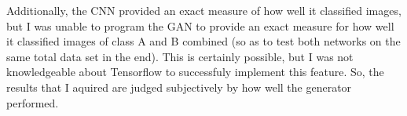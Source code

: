 \documentclass{article}
\begin{document}
Additionally, the CNN provided an exact measure of how well it classified images, but I was unable to program the GAN to provide an exact measure for how well it classified images of class A and B combined (so as to test both networks on the same total data set in the end).
This is certainly possible, but I was not knowledgeable about Tensorflow to successfuly implement this feature.
So, the results that I aquired are judged subjectively by how well the generator performed.

\end{document}
